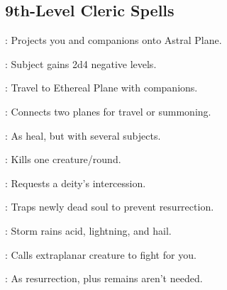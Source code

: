 \begin{multicols}{2}
\subsection{9th-Level Cleric Spells}
\begin{description*}
\item[\linkspell{Astral Projection}:] Projects you and companions onto Astral Plane.
\item[\linkspell{Energy Drain}:] Subject gains 2d4 negative levels.
\item[\linkspell{Etherealness}:] Travel to Ethereal Plane with companions.
\item[\linkspell{Gate}:] Connects two planes for travel or summoning.
\item[\linkspell{Heal, Mass}:] As heal, but with several subjects.
\item[\linkspell{Implosion}:] Kills one creature/round.
\item[\linkspell{Miracle}:] Requests a deity’s intercession.
\item[\linkspell{Soul Bind}:] Traps newly dead soul to prevent resurrection.
\item[\linkspell{Storm of Vengeance}:] Storm rains acid, lightning, and hail.
\item[\linkspell{Summon Monster IX}:] Calls extraplanar creature to fight for you.
\item[\linkspell{True Resurrection}:] As resurrection, plus remains aren’t needed.
\end{description*}

\end{multicols}
